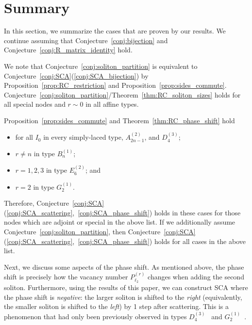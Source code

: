 \documentclass[reqno]{amsart}
\theoremstyle{plain}
\theoremstyle{definition}
\numberwithin{equation}{section}
\begin{document}



\section{Summary}
\label{sec:summary}

In this section, we summarize the cases that are proven by our results.
We continue assuming that Conjecture~\ref{conj:bijection} and Conjecture~\ref{conj:R_matrix_identity} hold.

We note that Conjecture~\ref{conj:soliton_partition} is equivalent to Conjecture~\ref{conj:SCA}(\ref{conj:SCA_bijection}) by Proposition~\ref{prop:RC_restriction} and Proposition~\ref{prop:sides_commute}.
Conjecture~\ref{conj:soliton_partition}/Theorem~\ref{thm:RC_soliton_sizes} holds for all special nodes and $r \sim 0$ in all affine types.

Proposition~\ref{prop:sides_commute} and Theorem~\ref{thm:RC_phase_shift}  hold
\begin{itemize}
\item for all $I_0$ in every simply-laced type, $A_{2n-1}^{(2)}$, and $D_4^{(3)}$;
\item $r \neq n$ in type $B_n^{(1)}$;
\item $r=1,2,3$ in type $E_6^{(2)}$; and
\item $r = 2$ in type $G_2^{(1)}$.
\end{itemize}
Therefore, Conjecture~\ref{conj:SCA}(\ref{conj:SCA_scattering},~\ref{conj:SCA_phase_shift}) holds in these cases for those nodes which are adjoint or special in the above list.
If we additionally assume Conjecture~\ref{conj:soliton_partition}, then Conjecture~\ref{conj:SCA}(\ref{conj:SCA_scattering},~\ref{conj:SCA_phase_shift}) holds for all cases in the above list.

Next, we discuss some aspects of the phase shift.
As mentioned above, the phase shift is precisely how the vacancy number $P_{\ell_2}^{(r)}$ changes when adding the second soliton.
Furthermore, using the results of this paper, we can construct SCA where the phase shift is \emph{negative}: the larger soliton is shifted to the \emph{right} (equivalently, the smaller soliton is shifted to the \emph{left}) by 1 step after scattering.
This is a phenomenon that had only been previously observed in types $D_4^{(3)}$~\cite{Yamada07} and $G_2^{(1)}$~\cite{MOW12}.
\end{document}
